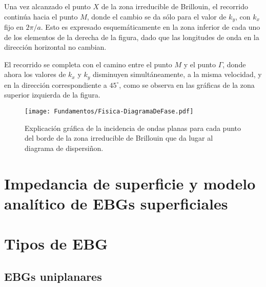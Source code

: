 Una vez alcanzado el punto $X$ de la zona irreducible de Brillouin, el recorrido continúa hacia el punto $M$, donde el cambio se da sólo para el valor de $k_y$, con $k_x$ fijo en $2\pi / a$. Esto es expresado esquemáticamente en la zona inferior de cada uno de los elementos de la derecha de la figura, dado que las longitudes de onda en la dirección horizontal no cambian.

El recorrido se completa con el camino entre el punto $M$ y el punto $\Gamma$, donde ahora los valores de $k_x$ y $k_y$ disminuyen simultáneamente, a la misma velocidad, y en la dirección correspondiente a $45^\circ$, como se observa en las gráficas de la zona superior izquierda de la figura.

\begin{figure}[h]
	\centering
	\texttt{[image: Fundamentos/Fisica-DiagramaDeFase.pdf]}
	\caption{Explicación gráfica de la incidencia de ondas planas para cada punto del borde de la zona irreducible de Brillouin que da lugar al diagrama de dispersiñon.}
	\label{fig:explicacion-zona-brillouin}
\end{figure}


\section{Impedancia de superficie y modelo analítico de EBGs superficiales}
\label{sec_imp_superficie}



\section{Tipos de EBG}
\label{sec_tipos_mtm}
\lipsum[1]
\subsection{EBGs uniplanares}
\label{subsec_ebg_uniplanar}
\lipsum
